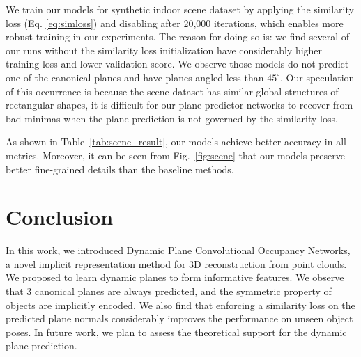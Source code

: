 \documentclass[10pt,twocolumn,letterpaper]{article}
\begin{document}
We train our models for synthetic indoor scene dataset by applying the similarity loss (Eq. \ref{eq:simloss}) and disabling after 20,000 iterations, which enables more robust training in our experiments.
The reason for doing so is: we find several of our runs without the similarity loss initialization have considerably higher training loss and lower validation score. We observe those models do not predict one of the canonical planes and have planes angled less than $45^\circ$. Our speculation of this occurrence is because the scene dataset has similar global structures of rectangular shapes, it is difficult for our plane predictor networks to recover from bad minimas when the plane prediction is not governed by the similarity loss.

As shown in Table~\ref{tab:scene_result}, our models achieve better accuracy in all metrics. Moreover, it can be seen from Fig.~\ref{fig:scene} that our models preserve better fine-grained details than the baseline methods.

\section{Conclusion}
In this work, we introduced Dynamic Plane Convolutional Occupancy Networks, a novel implicit representation method for 3D reconstruction from point clouds. We proposed to learn dynamic planes to form informative features. We observe that 3 canonical planes are always predicted, and the symmetric property of objects are implicitly encoded. We also find that enforcing a similarity loss on the predicted plane normals considerably improves the performance on unseen object poses. In future work, we plan to assess the theoretical support for the dynamic plane prediction. \\ \\


{\small


}
\end{document}
